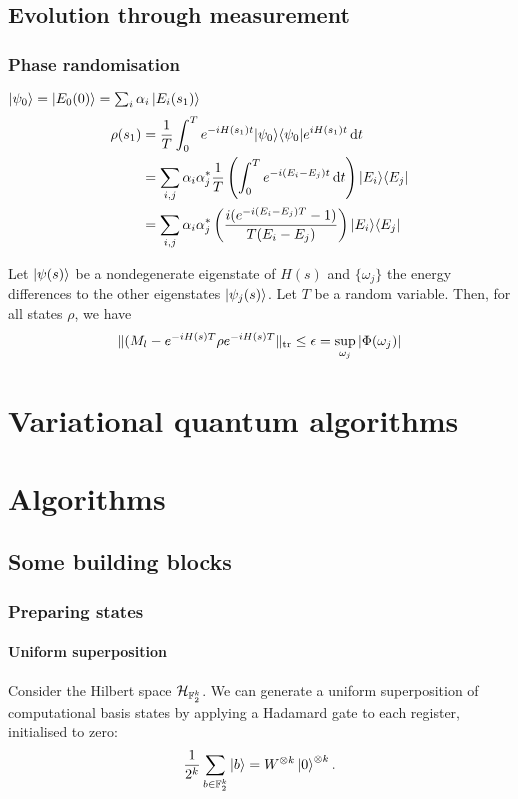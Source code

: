 \section{Evolution through measurement}
\subsection{Phase randomisation}
$\left| \psi_0 \right\rangle = \left| E_0(0) \right\rangle = \sum_i\alpha_i\left| E_i(s_1) \right\rangle$
\begin{align*}
\rho(s_1) &= \frac{1}{T}\int_0^T e^{-iH(s_1)t}|\psi_0\rangle\langle\psi_0| e^{iH(s_1)t} \operatorname{d \!}{t} \\
&= \sum_{i,j}\alpha_i\alpha_j^* \frac{1}{T}\left(\int_0^T e^{-i(E_i-E_j)t}\operatorname{d \!}{t}\right)|E_i\rangle\langle E_j| \\
&= \sum_{i,j}\alpha_i\alpha_j^* \left(\frac{i(e^{-i(E_i-E_j)T}-1)}{T(E_i-E_j)}\right)|E_i\rangle\langle E_j|
\end{align*}

\begin{theorem}
Let $\left| \psi(s) \right\rangle$ be a nondegenerate eigenstate of $H(s)$ and $\{\omega_j\}$ the energy differences to the other eigenstates $\left| \psi_j(s) \right\rangle$. Let $T$ be a random variable. Then, for all states $\rho$, we have
\[ \lVert(M_l - e^{-iH(s)T}\rho e^{-iH(s)T}\rVert_\text{tr} \leq \epsilon = \sup_{\omega_j}|\Phi(\omega_j)| \]
\end{theorem}

\chapter{Variational quantum algorithms}

\chapter{Algorithms}
\section{Some building blocks}
\subsection{Preparing states}
\subsubsection{Uniform superposition}
\begin{lemma}
Consider the Hilbert space $\mathcal{H}_{\mathbb{F}_2^k}$. We can generate a uniform superposition of computational basis states by applying a Hadamard gate to each register, initialised to zero:
\[ \frac{1}{2^k}\sum_{b\in \mathbb{F}_2^k}\left| b \right\rangle = W^{\otimes k}\left| 0 \right\rangle^{\otimes k}. \]
\end{lemma}

